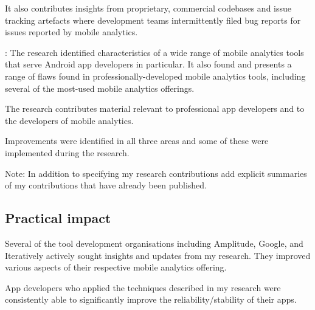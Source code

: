 It also contributes insights from proprietary, commercial codebases and issue tracking artefacts where development teams intermittently filed bug reports for issues reported by mobile analytics.

:
The research identified characteristics of a wide range of mobile analytics tools that serve Android app developers in particular. It also found and  presents a range of flaws found in professionally-developed mobile analytics tools, including several of the most-used mobile analytics offerings.

The research contributes material relevant to professional app developers and to the developers of mobile analytics. 

Improvements were identified in all three areas and some of these were implemented during the research. 

Note: In addition to specifying my research contributions add explicit summaries of my contributions that have already been published.

\subsection{Practical impact}
Several of the tool development organisations including Amplitude, Google, and Iteratively actively sought insights and updates from my research. They improved various aspects of their respective mobile analytics offering.

App developers who applied the techniques described in my research were consistently able to significantly improve the reliability/stability of their apps.
